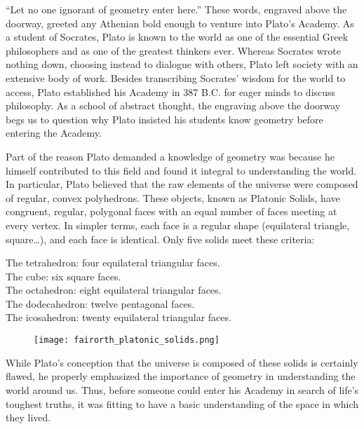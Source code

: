“Let no one ignorant of geometry enter here.” These words, engraved above the doorway, greeted any Athenian bold enough to venture into Plato’s Academy. As a student of Socrates, Plato is known to the world as one of the essential Greek philosophers and as one of the greatest thinkers ever. Whereas Socrates wrote nothing down, choosing instead to dialogue with others, Plato left society with an extensive body of work. Besides transcribing Socrates’ wisdom for the world to access, Plato established his Academy in 387 B.C. for eager minds to discuss philosophy. As a school of abstract thought, the engraving above the doorway begs us to question why Plato insisted his students know geometry before entering the Academy.

Part of the reason Plato demanded a knowledge of geometry was because he himself contributed to this field and found it integral to understanding the world. In particular, Plato believed that the raw elements of the universe were composed of regular, convex polyhedrons. These objects, known as Platonic Solids, have congruent, regular, polygonal faces with an equal number of faces meeting at every vertex. In simpler terms, each face is a regular shape (equilateral triangle, square…), and each face is identical. Only five solids meet these criteria:

\begin{center}
The tetrahedron: four equilateral triangular faces.\\
The cube: six square faces.\\
The octahedron: eight equilateral triangular faces.\\
The dodecahedron: twelve pentagonal faces.\\
The icosahedron: twenty equilateral triangular faces.\\
\end{center}

\begin{figure}[h]
  \begin{center}
    \texttt{[image: fairorth\_platonic\_solids.png]}
  \end{center}
\end{figure}

While Plato’s conception that the universe is composed of these solids is certainly flawed, he properly emphasized the importance of geometry in understanding the world around us. Thus, before someone could enter his Academy in search of life’s toughest truths, it was fitting to have a basic understanding of the space in which they lived. 
	
